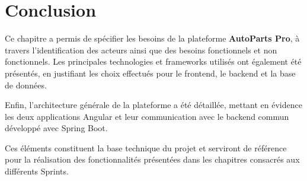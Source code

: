 \section{Conclusion}

Ce chapitre a permis de spécifier les besoins de la plateforme \textbf{AutoParts Pro}, à travers l'identification des acteurs ainsi que des besoins fonctionnels et non fonctionnels. Les principales technologies et frameworks utilisés ont également été présentés, en justifiant les choix effectués pour le frontend, le backend et la base de données.

Enfin, l'architecture générale de la plateforme a été détaillée, mettant en évidence les deux applications Angular et leur communication avec le backend commun développé avec Spring Boot.

Ces éléments constituent la base technique du projet et serviront de référence pour la réalisation des fonctionnalités présentées dans les chapitres consacrés aux différents Sprints.